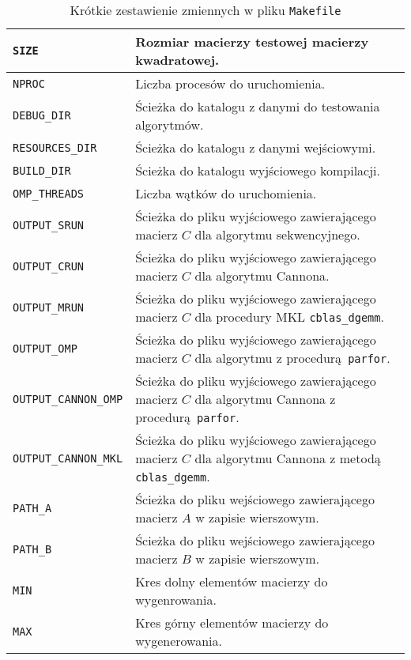 \begin{table}[H]
\footnotesize
\begin{tabular}{|L{4cm}|L{9cm}|}
 \hline
\texttt{SIZE} & Rozmiar macierzy testowej macierzy kwadratowej.\\ \hline
\texttt{NPROC} & Liczba procesów do uruchomienia.\\ \hline
\texttt{DEBUG\_DIR} & Ścieżka do katalogu z danymi do testowania algorytmów. \\ \hline
\texttt{RESOURCES\_DIR} & Ścieżka do katalogu z danymi wejściowymi. \\ \hline
\texttt{BUILD\_DIR} & Ścieżka do katalogu wyjściowego kompilacji. \\ \hline
\texttt{OMP\_THREADS} & Liczba wątków do uruchomienia. \\ \hline
\texttt{OUTPUT\_SRUN} & Ścieżka do pliku wyjściowego zawierającego macierz \(C\) dla algorytmu sekwencyjnego. \\ \hline
\texttt{OUTPUT\_CRUN} & Ścieżka do pliku wyjściowego zawierającego macierz \(C\) dla algorytmu Cannona. \\ \hline
\texttt{OUTPUT\_MRUN} & Ścieżka do pliku wyjściowego zawierającego macierz \(C\) dla procedury MKL \texttt{cblas\_dgemm}. \\ \hline
\texttt{OUTPUT\_OMP} & Ścieżka do pliku wyjściowego zawierającego macierz \(C\) dla algorytmu z procedurą \texttt{parfor}. \\ \hline
\texttt{OUTPUT\_CANNON\_OMP} & Ścieżka do pliku wyjściowego zawierającego macierz \(C\) dla algorytmu Cannona z procedurą \texttt{parfor}. \\ \hline
\texttt{OUTPUT\_CANNON\_MKL} & Ścieżka do pliku wyjściowego zawierającego macierz \(C\) dla algorytmu Cannona z metodą \texttt{cblas\_dgemm}. \\ \hline
\texttt{PATH\_A} & Ścieżka do pliku wejściowego zawierającego macierz \(A\) w zapisie wierszowym. \\ \hline
\texttt{PATH\_B} & Ścieżka do pliku wejściowego zawierającego macierz \(B\) w zapisie wierszowym. \\ \hline
\texttt{MIN} & Kres dolny elementów macierzy do wygenrowania. \\ \hline
\texttt{MAX} & Kres górny elementów macierzy do wygenerowania. \\ \hline
\end{tabular}
\caption{Krótkie zestawienie zmiennych w pliku \texttt{Makefile}}
\label{tab:makefile_vars}
\end{table}

